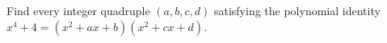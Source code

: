 Find every integer quadruple $(a,b,c,d)$ satisfying the polynomial identity $x^4+4=(x^2+ax+b)(x^2+cx+d)$.
